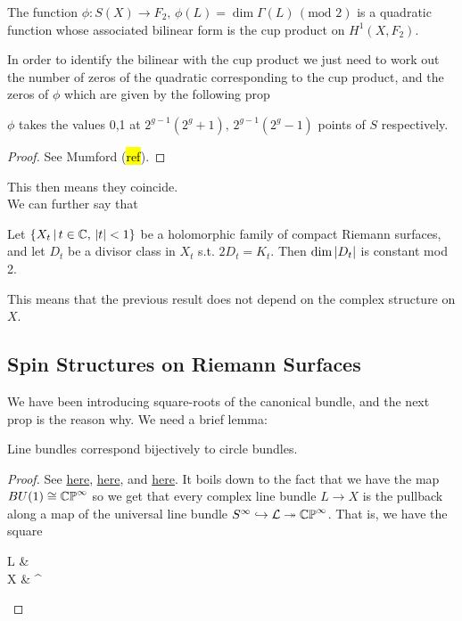 \documentclass{article}
\begin{document}
\begin{theorem}
	The function $\phi:S(X) \to F_2, \, \phi(L) = \dim \Gamma(L) \, (\text{mod } 2)$ is a quadratic function whose associated bilinear form is the cup product on $H^1(X,F_2)$. 
\end{theorem}
In order to identify the bilinear with the cup product we just need to work out the number of zeros of the quadratic corresponding to the cup product, and the zeros of $\phi$ which are given by the following prop
\begin{prop}
	$\phi$ takes the values 0,1 at $2^{g-1}(2^g+1), \, 2^{g-1}(2^g-1)$ points of $S$ respectively. 
\end{prop}
\begin{proof}
	See Mumford (\hl{ref}).
\end{proof}
This then means they coincide. \\
We can further say that 
\begin{theorem}
	Let $\left\{ X_t \, | \, t \in \mathbb{C}, \, \left\lvert t \right\rvert<1 \right\}$ be a holomorphic family of compact Riemann surfaces, and let $D_t$ be a divisor class in $X_t$ s.t. $2D_t = K_t$. Then $\dim \left\lvert D_t \right\rvert$ is constant mod 2.  
\end{theorem}
This means that the previous result does not depend on the complex structure on $X$. 

\subsection{Spin Structures on Riemann Surfaces}
We have been introducing square-roots of the canonical bundle, and the next prop is the reason why. We need a brief lemma:

\begin{lemma}
	Line bundles correspond bijectively to circle bundles.
\end{lemma}
\begin{proof}
	See \href{https://ncatlab.org/nlab/show/classifying+space}{here}, \href{https://ncatlab.org/nlab/show/circle+bundle}{here}, and \href{https://en.wikipedia.org/wiki/Complex_projective_space}{here}. It boils down to the fact that we have the map $BU(1) \cong \mathbb{CP}^\infty$ so we get that every complex line bundle $L \to X$ is the pullback along a map of the universal line bundle $S^\infty \hookrightarrow \mathcal{L} \twoheadrightarrow \mathbb{CP}^\infty$. That is, we have the square
	\begin{tkz}
		L \arrow[r] \arrow[d] &  \arrow[d] \\ X \arrow[r] & ^\infty  
	\end{tkz}
\end{proof}
\end{document}
